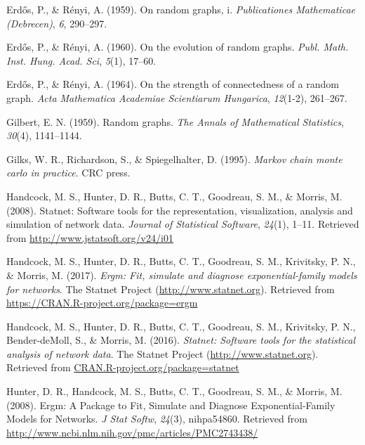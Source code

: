 \documentclass[12pt,twoside]{amherstthesis}
\begin{document}
  \hypertarget{ref-erdos1959random}{}
  Erd\H{o}s, P., \& Rényi, A. (1959). On random graphs, i.
  \emph{Publicationes Mathematicae (Debrecen)}, \emph{6}, 290--297.
  
  \hypertarget{ref-erdos1960evolution}{}
  Erd\H{o}s, P., \& Rényi, A. (1960). On the evolution of random graphs.
  \emph{Publ. Math. Inst. Hung. Acad. Sci}, \emph{5}(1), 17--60.
  
  \hypertarget{ref-erdHos1964strength}{}
  Erd\H{o}s, P., \& Rényi, A. (1964). On the strength of connectedness of
  a random graph. \emph{Acta Mathematica Academiae Scientiarum Hungarica},
  \emph{12}(1-2), 261--267.
  
  \hypertarget{ref-gilbert1959random}{}
  Gilbert, E. N. (1959). Random graphs. \emph{The Annals of Mathematical
  Statistics}, \emph{30}(4), 1141--1144.
  
  \hypertarget{ref-gilks1995markov}{}
  Gilks, W. R., Richardson, S., \& Spiegelhalter, D. (1995). \emph{Markov
  chain monte carlo in practice}. CRC press.
  
  \hypertarget{ref-statnetpackagearticle}{}
  Handcock, M. S., Hunter, D. R., Butts, C. T., Goodreau, S. M., \&
  Morris, M. (2008). Statnet: Software tools for the representation,
  visualization, analysis and simulation of network data. \emph{Journal of
  Statistical Software}, \emph{24}(1), 1--11. Retrieved from
  \url{http://www.jstatsoft.org/v24/i01}
  
  \hypertarget{ref-ergmpackagemanual}{}
  Handcock, M. S., Hunter, D. R., Butts, C. T., Goodreau, S. M.,
  Krivitsky, P. N., \& Morris, M. (2017). \emph{Ergm: Fit, simulate and
  diagnose exponential-family models for networks}. The Statnet Project
  (\url{http://www.statnet.org}). Retrieved from
  \url{https://CRAN.R-project.org/package=ergm}
  
  \hypertarget{ref-statnetpackagemanual}{}
  Handcock, M. S., Hunter, D. R., Butts, C. T., Goodreau, S. M.,
  Krivitsky, P. N., Bender-deMoll, S., \& Morris, M. (2016).
  \emph{Statnet: Software tools for the statistical analysis of network
  data}. The Statnet Project (\url{http://www.statnet.org}). Retrieved
  from \url{CRAN.R-project.org/package=statnet}
  
  \hypertarget{ref-hunter_ergm:_2008}{}
  Hunter, D. R., Handcock, M. S., Butts, C. T., Goodreau, S. M., \&
  Morris, M. (2008). Ergm: A Package to Fit, Simulate and Diagnose
  Exponential-Family Models for Networks. \emph{J Stat Softw},
  \emph{24}(3), nihpa54860. Retrieved from
  \url{http://www.ncbi.nlm.nih.gov/pmc/articles/PMC2743438/}
  
\end{document}
